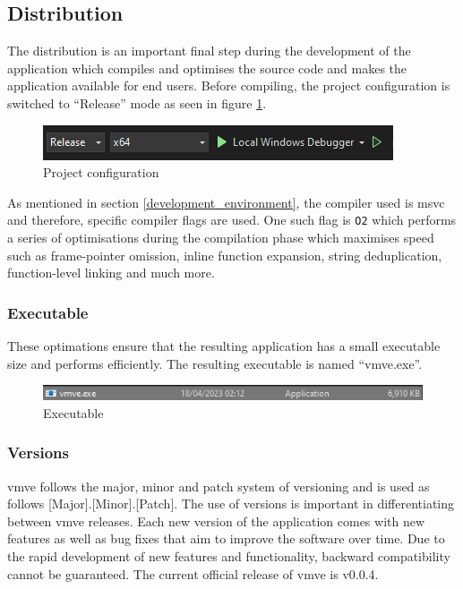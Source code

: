 \documentclass[11pt]{article}
\begin{document}
\subsection{Distribution}
The distribution is an important final step during the development of the
application which compiles and optimises the source code and makes the
application available for end users. Before compiling, the project configuration
is switched to ``Release'' mode as seen in figure \ref{fig:project_configuration}.

\begin{figure}[H]
  \centering
  \includegraphics[width=\textwidth]{images/project_configuration.png}
  \caption{Project configuration}
  \label{fig:project_configuration}
\end{figure}

As mentioned in section \ref{development_environment}, the compiler used is
\gls*{msvc} and therefore, specific compiler flags are used. One such flag is
\lstinline{O2} which performs a series of optimisations during the compilation
phase which maximises speed such as frame-pointer omission, inline function
expansion, string deduplication, function-level linking and much more.

\subsubsection{Executable}
These optimations ensure that the resulting application has a small executable size
and performs efficiently. The resulting executable is named ``vmve.exe''.

\begin{figure}[H]
  \centering
  \includegraphics[width=\textwidth]{images/executable.png}
  \caption{Executable}
  \label{fig:executable}
\end{figure}

\subsubsection{Versions}
\gls*{vmve} follows the major, minor and patch system of versioning and is used
as follows [Major].[Minor].[Patch]. The use of versions is important in
differentiating between \gls*{vmve} releases. Each new version of the application
comes with new features as well as bug fixes that aim to improve the software
over time. Due to the rapid development of new features and functionality,
backward compatibility cannot be guaranteed. The current official release of
\gls*{vmve} is v0.0.4.
\end{document}
